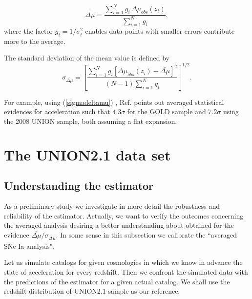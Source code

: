 \documentclass[nofootinbib,twocolumn]{revtex4}
\begin{document}
\begin{equation}
\overline{\Delta\mu}=\frac{\sum_{i=1}^{N} g_i \,\Delta\mu_{obs}(z_i)}{\sum_{i=1}^{N} g_i},
\end{equation}
where the factor $g_i = 1/ \sigma^{2}_i$ enables data points with smaller errors contribute more to the average. 

The standard deviation of the mean value is defined by
\begin{equation}
\sigma_{\overline{\Delta\mu}}=\left[\frac{\sum^N_{i=1} g_i \left[\Delta \mu_{obs} \left(z_i\right) - \overline{\Delta\mu}\right]^2}{(N-1)\sum^N_{i=1}g_i}\right]^{1/2}.
\label{sigmadeltamu}
\end{equation}

For example, using (\ref{sigmadeltamu}) , Ref. \cite{Seikel:2008ms} points out averaged statistical evidences for acceleration such that $4.3\sigma$ for the GOLD sample and $7.2\sigma$ using the 2008 UNION sample, both assuming a flat expansion.

\section{The UNION2.1 data set}

\subsection{Understanding the estimator}

As a preliminary study we investigate in more detail the robustness and reliability of the estimator. Actually, we want to verify the outcomes concerning the averaged analysis desiring a better understanding about obtained for the evidence $\overline{\Delta\mu} / \sigma_{\overline{\Delta\mu}}$. In some sense in this subsection we calibrate the ``averaged SNe Ia analysis".



Let us simulate catalogs for given cosmologies in which we know in advance the state of acceleration for every redshift. Then we confront the simulated data with the predictions of the estimator for a given actual catalog. We shall use the redshift distribution of UNION2.1 sample as our reference. 
\end{document}
